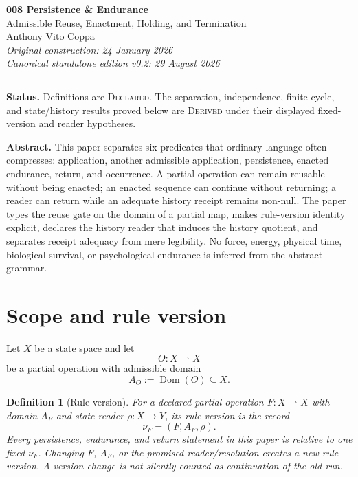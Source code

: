 \documentclass[11pt]{article}
\newtheorem{definition}[theorem]{Definition}
\newcommand{\status}[1]{\textbf{Status.} #1}
\begin{document}
\begin{center}
{\Large\bfseries 008 Persistence \& Endurance}\\[3pt]
{\large Admissible Reuse, Enactment, Holding, and Termination}\\[10pt]
Anthony Vito Coppa\\[2pt]
\textit{Original construction: 24 January 2026}\\
\textit{Canonical standalone edition v0.2: 29 August 2026}
\end{center}
\vspace{3pt}
\hrule
\vspace{8pt}

\status{Definitions are \textsc{Declared}. The separation, independence, finite-cycle, and state/history results proved below are \textsc{Derived} under their displayed fixed-version and reader hypotheses.}

\textbf{Abstract.} This paper separates six predicates that ordinary language often compresses: application, another admissible application, persistence, enacted endurance, return, and occurrence. A partial operation can remain reusable without being enacted; an enacted sequence can continue without returning; a reader can return while an adequate history receipt remains non-null. The paper types the reuse gate on the domain of a partial map, makes rule-version identity explicit, declares the history reader that induces the history quotient, and separates receipt adequacy from mere legibility. No force, energy, physical time, biological survival, or psychological endurance is inferred from the abstract grammar.

\section{Scope and rule version}
Let $X$ be a state space and let
\[
O:X\rightharpoonup X
\]
be a partial operation with admissible domain
\[
A_O:=\operatorname{Dom}(O)\subseteq X.
\]

\begin{definition}[Rule version]
For a declared partial operation $F:X\rightharpoonup X$ with domain $A_F$ and state reader $\rho:X\to Y$, its rule version is the record
\[
\nu_F=(F,A_F,\rho).
\]
Every persistence, endurance, and return statement in this paper is relative to one fixed $\nu_F$. Changing $F$, $A_F$, or the promised reader/resolution creates a new rule version. A version change is not silently counted as continuation of the old run.
\end{definition}
\end{document}
